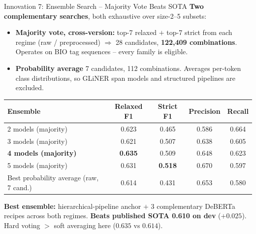 \documentclass[aspectratio=169,10pt]{beamer}
\newcommand{\sota}{\textcolor{accent}{\textbf{0.610}}}
\newcommand{\ours}{\textcolor{good}{\textbf{0.635}}}
\begin{document}
\begin{frame}{Innovation 7: Ensemble Search -- Majority Vote Beats SOTA}
  \scriptsize
  \textbf{Two complementary searches}, both exhaustive over size-2--5 subsets:
  \begin{itemize}\setlength{\itemsep}{0pt}
    \item \textbf{Majority vote, cross-version:} top-7 relaxed $+$ top-7 strict from each regime (raw / preprocessed) $\Rightarrow$ 28 candidates, \textbf{122{,}409 combinations}. Operates on BIO tag sequences -- every family is eligible.
    \item \textbf{Probability average} 7 candidates, 112 combinations. Averages per-token class distributions, so GLiNER span models and structured pipelines are excluded.
  \end{itemize}

  \begin{center}\scriptsize
  \begin{tabular}{lcccc}
    \toprule
    Ensemble & Relaxed F1 & Strict F1 & Precision & Recall \\
    \midrule
    2 models (majority) & 0.623 & 0.465 & 0.586 & 0.664 \\
    3 models (majority) & 0.621 & 0.507 & 0.638 & 0.605 \\
    \rowcolor{good!15}
    \textbf{4 models (majority)} & \ours & 0.509 & 0.648 & 0.623 \\
    5 models (majority) & 0.631 & \textbf{0.518} & 0.670 & 0.597 \\
    \midrule
    Best probability average (raw, 7 cand.) & 0.614 & 0.431 & 0.653 & 0.580 \\
    \bottomrule
  \end{tabular}
  \end{center}
  \medskip

  \textbf{Best ensemble:} hierarchical-pipeline anchor $+$ 3 complementary DeBERTa recipes across both regimes. \textbf{Beats published SOTA \sota{} on dev} ($+0.025$). Hard voting $>$ soft averaging here ($0.635$ vs $0.614$).
\end{frame}
\end{document}
